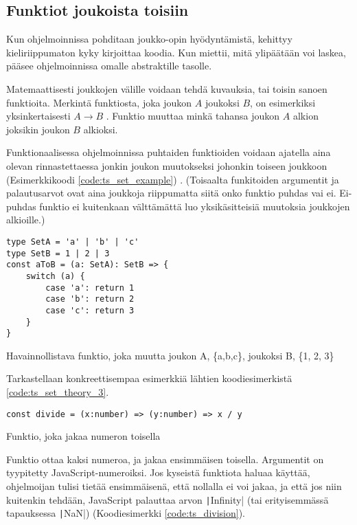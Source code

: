 \subsection{Funktiot joukoista toisiin}
Kun ohjelmoinnissa pohditaan joukko-opin hyödyntämistä, kehittyy kieliriippumaton kyky kirjoittaa koodia. Kun miettii, mitä ylipäätään voi laskea, pääsee ohjelmoinnissa omalle abstraktille tasolle. \citep{Tan2004,BlellochHarper2015}


Matemaattisesti joukkojen välille voidaan tehdä kuvauksia, tai toisin sanoen funktioita. Merkintä funktiosta, joka  joukon $A$ joukoksi $B$, on esimerkiksi yksinkertaisesti $A \to B$ \cite{mellin2005joukkooppi}. Funktio muuttaa minkä tahansa joukon $A$ alkion joksikin joukon $B$ alkioksi.

Funktionaalisessa ohjelmoinnissa puhtaiden funktioiden voidaan ajatella aina olevan rinnastettaessa jonkin joukon muutokseksi johonkin toiseen joukkoon (Esimerkkikoodi \ref{code:ts_set_example}) \cite{bartosz_category_for_progamers}. (Toisaalta funkitoiden argumentit ja palautusarvot ovat aina joukkoja riippumatta siitä onko funktio puhdas vai ei. Ei-puhdas funktio ei kuitenkaan välttämättä luo yksikäsitteisiä muutoksia joukkojen alkioille.)

\begin{code}
    \begin{verbatim}
type SetA = 'a' | 'b' | 'c'
type SetB = 1 | 2 | 3
const aToB = (a: SetA): SetB => {
    switch (a) {
        case 'a': return 1
        case 'b': return 2
        case 'c': return 3
    }
}  
\end{verbatim}
    \caption{Havainnollistava funktio, joka muutta joukon A, \{a,b,c\}, joukoksi B, \{1, 2, 3\}}
    \label{code:ts_set_example}
\end{code}



Tarkastellaan konkreettisempaa esimerkkiä lähtien koodiesimerkistä \ref{code:ts_set_theory_3}.

\begin{code}
    \begin{verbatim}
const divide = (x:number) => (y:number) => x / y
\end{verbatim}
    \caption{Funktio, joka jakaa numeron toisella}
    \label{code:ts_set_theory_3}
\end{code}



Funktio ottaa kaksi numeroa, ja jakaa ensimmäisen toisella. Argumentit on tyypitetty JavaScript-numeroiksi. Jos kyseistä funktiota haluaa käyttää, ohjelmoijan tulisi tietää ensimmäisenä, että nollalla ei voi jakaa, ja että jos niin kuitenkin tehdään, JavaScript palauttaa arvon \texttt|Infinity| (tai erityisemmässä tapauksessa \texttt|NaN|) (Koodiesimerkki \ref{code:ts_division}).

